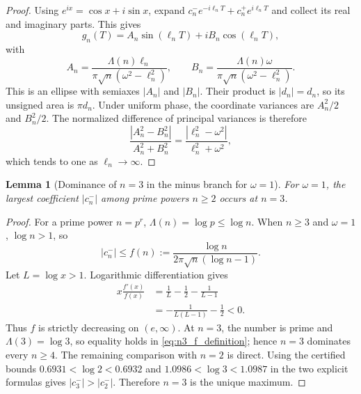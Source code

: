 \documentclass[11pt]{amsart}
\numberwithin{equation}{section}
\theoremstyle{plain}
\newtheorem{lemma}[theorem]{Lemma}
\theoremstyle{definition}
\theoremstyle{remark}
\newcommand{\1}{\mathbf{1}}
\begin{document}
\begin{proof}
Using \(e^{ix}=\cos x+i\sin x\), expand
\(c_n^-e^{-i\ell_nT}+c_n^+e^{i\ell_nT}\) and collect its real and
imaginary parts.  This gives
\begin{equation}
g_n(T)=A_n\sin(\ell_nT)+iB_n\cos(\ell_nT),
\label{eq:ellipse_parametric_proof}
\end{equation}
with
\begin{equation}
A_n=
\frac{\Lambda(n)\ell_n}{\pi\sqrt n(\omega^2-\ell_n^2)},
\qquad
B_n=
\frac{\Lambda(n)\omega}{\pi\sqrt n(\omega^2-\ell_n^2)}.
\label{eq:ellipse_axes_proof}
\end{equation}
This is an ellipse with semiaxes \(|A_n|\) and \(|B_n|\).  Their product
is \(|d_n|=d_n\), so its unsigned area is \(\pi d_n\).  Under uniform
phase, the coordinate variances are \(A_n^2/2\) and \(B_n^2/2\).  The
normalized difference of principal variances is therefore
\begin{equation}
\frac{|A_n^2-B_n^2|}{A_n^2+B_n^2}
=
\frac{|\ell_n^2-\omega^2|}{\ell_n^2+\omega^2},
\label{eq:anisotropy_proof_ratio}
\end{equation}
which tends to one as \(\ell_n\to\infty\).
\end{proof}

\begin{lemma}[Dominance of \(n=3\) in the minus branch for \(\omega=1\)]
\label{lem:n3_dominance}
For \(\omega=1\), the largest coefficient
\(|c_n^-|\) among prime powers \(n\geq2\) occurs at \(n=3\).
\end{lemma}

\begin{proof}
For a prime power \(n=p^r\), \(\Lambda(n)=\log p\leq\log n\).  When
\(n\geq3\) and \(\omega=1\), \(\log n>1\), so
\begin{equation}
|c_n^-|
\leq
f(n)
:=
\frac{\log n}{2\pi\sqrt n(\log n-1)}.
\label{eq:n3_f_definition}
\end{equation}
Let \(L=\log x>1\).  Logarithmic differentiation gives
\begin{align}
x\frac{f'(x)}{f(x)}
&=
\frac1L-\frac12-\frac1{L-1}
\label{eq:n3_log_derivative_one}
\\
&=
-\frac1{L(L-1)}-\frac12<0.
\label{eq:n3_log_derivative_two}
\end{align}
Thus \(f\) is strictly decreasing on \((e,\infty)\).  At \(n=3\), the
number is prime and \(\Lambda(3)=\log3\), so equality holds in
\eqref{eq:n3_f_definition}; hence \(n=3\) dominates every \(n\geq4\).
The remaining comparison with \(n=2\) is direct.  Using the certified
bounds \(0.6931<\log2<0.6932\) and
\(1.0986<\log3<1.0987\) in the two explicit formulas gives
\(|c_3^-|>|c_2^-|\).  Therefore \(n=3\) is the unique maximum.
\end{proof}
\end{document}
